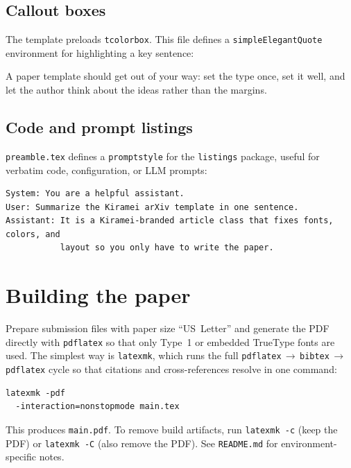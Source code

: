 \documentclass[11pt,letterpaper,twocolumn]{template/style}
\begin{document}
\subsection{Callout boxes}
\label{sec:callout}

The template preloads \verb+tcolorbox+. This file defines a \verb+simpleElegantQuote+
environment for highlighting a key sentence:

\begin{simpleElegantQuote}
A paper template should get out of your way: set the type once, set it well, and
let the author think about the ideas rather than the margins.
\end{simpleElegantQuote}

\subsection{Code and prompt listings}
\label{sec:listings}

{\raggedright
\verb+preamble.tex+ defines a \verb+promptstyle+ for the \verb+listings+ package,
useful for verbatim code, configuration, or LLM prompts:
\par}

\begin{lstlisting}[style=promptstyle]
System: You are a helpful assistant.
User: Summarize the Kiramei arXiv template in one sentence.
Assistant: It is a Kiramei-branded article class that fixes fonts, colors, and
           layout so you only have to write the paper.
\end{lstlisting}


\section{Building the paper}
\label{sec:building}

Prepare submission files with paper size ``US~Letter'' and generate the PDF
directly with \verb+pdflatex+ so that only Type~1 or embedded TrueType fonts are
used. The simplest way is \verb+latexmk+, which runs the full
\verb+pdflatex+\,$\rightarrow$\,\verb+bibtex+\,$\rightarrow$\,\verb+pdflatex+ cycle
so that citations and cross-references resolve in one command:
\begin{verbatim}
latexmk -pdf
  -interaction=nonstopmode main.tex
\end{verbatim}
This produces \verb+main.pdf+. To remove build artifacts, run
\verb+latexmk -c+ (keep the PDF) or \verb+latexmk -C+ (also remove the PDF). See
\verb+README.md+ for environment-specific notes.
\end{document}

